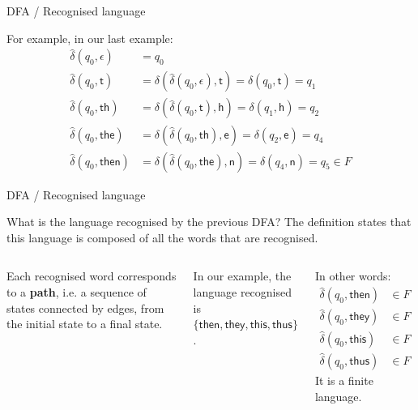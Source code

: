 \documentclass[compress,dvips,xcolor={dvipsnames},t]{beamer}
\begin{document}
%
\begin{frame}{DFA / Recognised language}

For example, in our last example:
\[
\begin{aligned}
   \hat{\delta}(q_0, \epsilon)
&= q_0\\
   \hat{\delta}(q_0, \textsf{t})
&= \delta (\hat{\delta}(q_0, \epsilon), \textsf{t})
= \delta (q_0, \textsf{t})
= q_1\\
   \hat{\delta}(q_0, \textsf{th})
&= \delta (\hat{\delta}(q_0, \textsf{t}), \textsf{h})
= \delta (q_1, \textsf{h})
= q_2\\
   \hat{\delta}(q_0, \textsf{the})
&= \delta (\hat{\delta}(q_0, \textsf{th}), \textsf{e})
= \delta (q_2, \textsf{e})
= q_4\\
   \hat{\delta}(q_0, \textsf{then})
&= \delta (\hat{\delta}(q_0, \textsf{the}), \textsf{n})
= \delta (q_4, \textsf{n})
= q_5 \in F
\end{aligned}
\]

\end{frame}

%
\begin{frame}{DFA / Recognised language}

What is the language recognised by the previous DFA? The definition
states that this language is composed of all the words that are
recognised.

\bigskip

\begin{columns}

   Each recognised word corresponds to a
  \textbf{path}, i.e. a sequence of states connected by edges, from
  the initial state to a final state.

  \bigskip

  In our example, the language recognised is \(\{\textsf{then},
  \textsf{they}, \textsf{this}, \textsf{thus}\}\).

   In other words:
  \begin{align*}
    \hat{\delta}(q_0, \textsf{then}) &\in F\\
    \hat{\delta}(q_0, \textsf{they}) &\in F\\
    \hat{\delta}(q_0, \textsf{this}) &\in F\\
    \hat{\delta}(q_0, \textsf{thus}) &\in F
  \end{align*}
  It is a finite language.

\end{columns}

\end{frame}
\end{document}
